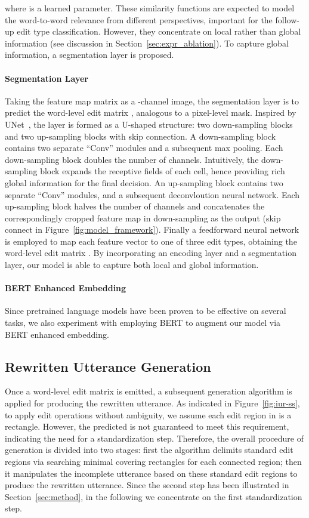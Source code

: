 \documentclass[11pt,a4paper]{article}
\begin{document}
where  is a learned parameter. These similarity functions are expected to model the word-to-word relevance from different perspectives, important for the follow-up edit type classification. 
However, they concentrate on local rather than global information (see discussion in Section~\ref{sec:expr_ablation}). To capture global information, a segmentation layer is proposed.

\paragraph{Segmentation Layer} Taking the feature map matrix  as a -channel image, the segmentation layer is to predict the word-level edit matrix , analogous to a pixel-level mask. Inspired by UNet~\cite{RFB15a}, the layer is formed as a U-shaped structure: two down-sampling blocks and two up-sampling blocks with skip connection. A down-sampling block contains two separate ``Conv'' modules and a subsequent max pooling. Each down-sampling block doubles the number of channels. Intuitively, the down-sampling block expands the receptive fields of each cell, hence providing rich global information for the final decision. An up-sampling block contains two separate ``Conv'' modules, and a subsequent deconvloution neural network. Each up-sampling block halves the number of channels and concatenates the correspondingly cropped feature map in down-sampling as the output (skip connect in Figure~\ref{fig:model_framework}). Finally a feedforward neural network is employed to map each feature vector to one of three edit types, obtaining the word-level edit matrix .
By incorporating an encoding layer and a segmentation layer, our model is able to capture both local and global information.

\paragraph{BERT Enhanced Embedding} Since pretrained language models have been proven to be effective on several tasks, we also experiment with employing BERT \cite{devlin-etal-2019-bert} to augment our model via BERT enhanced embedding.

\subsection{Rewritten Utterance Generation}

Once a word-level edit matrix is emitted, a subsequent generation algorithm is applied for producing the rewritten utterance. As indicated in Figure~\ref{fig:iur-ss}, to apply edit operations without ambiguity, we assume each edit region in  is a rectangle. However, the predicted  is not guaranteed to meet this requirement, indicating the need for a standardization step. Therefore, the overall procedure of generation is divided into two stages: first the algorithm delimits standard edit regions via searching minimal covering rectangles for each connected region; then it manipulates the incomplete utterance based on these standard edit regions to produce the rewritten utterance. Since the second step has been illustrated in Section~\ref{sec:method}, in the following we concentrate on the first standardization step.
\end{document}
